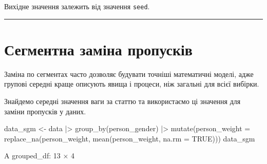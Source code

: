 \documentclass[
  letterpaper,
  DIV=11,
  numbers=noendperiod]{scrreprt}
\newenvironment{Shaded}{\begin{snugshade}}{\end{snugshade}}
\newcommand{\AttributeTok}[1]{\textcolor[rgb]{0.40,0.45,0.13}{#1}}
\newcommand{\ConstantTok}[1]{\textcolor[rgb]{0.56,0.35,0.01}{#1}}
\newcommand{\FunctionTok}[1]{\textcolor[rgb]{0.28,0.35,0.67}{#1}}
\newcommand{\NormalTok}[1]{\textcolor[rgb]{0.00,0.23,0.31}{#1}}
\newcommand{\OtherTok}[1]{\textcolor[rgb]{0.00,0.23,0.31}{#1}}
\newcommand{\SpecialCharTok}[1]{\textcolor[rgb]{0.37,0.37,0.37}{#1}}
\begin{document}
Вихідне значення залежить від значення \texttt{seed}.

\begin{center}\rule{0.5\linewidth}{0.5pt}\end{center}

\section{Сегментна заміна
пропусків}\label{ux441ux435ux433ux43cux435ux43dux442ux43dux430-ux437ux430ux43cux456ux43dux430-ux43fux440ux43eux43fux443ux441ux43aux456ux432}

Заміна по сегментах часто дозволяє будувати точніші математичні моделі,
адже групові середні краще описують явища і процеси, ніж загальні для
всієї вибірки.

Знайдемо середні значення ваги за статтю та використаємо ці значення для
заміни пропусків у даних.

\begin{Shaded}
\begin{Highlighting}[]
\NormalTok{data\_sgm }\OtherTok{\textless{}{-}}\NormalTok{ data }\SpecialCharTok{|\textgreater{}} 
                \FunctionTok{group\_by}\NormalTok{(person\_gender) }\SpecialCharTok{|\textgreater{}}
                \FunctionTok{mutate}\NormalTok{(}\AttributeTok{person\_weight =} \FunctionTok{replace\_na}\NormalTok{(person\_weight, }\FunctionTok{mean}\NormalTok{(person\_weight, }\AttributeTok{na.rm =} \ConstantTok{TRUE}\NormalTok{)))}
\NormalTok{data\_sgm}
\end{Highlighting}
\end{Shaded}

A grouped\_df: 13 × 4
\end{document}
